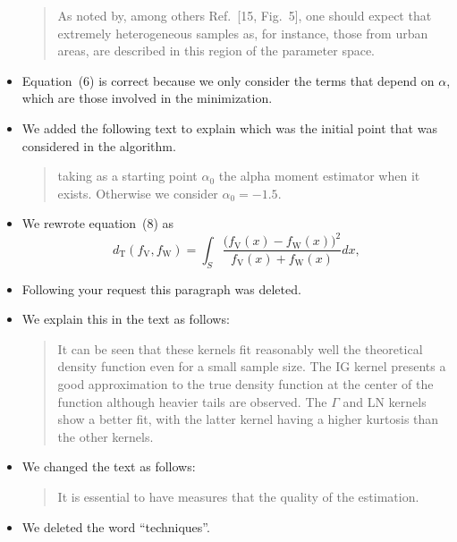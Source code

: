 \documentclass{ar2rc}
\begin{document}
\begin{itemize}
\begin{quote}
			As noted by, among others Ref.~[15, Fig.~5], one should expect that extremely heterogeneous samples as, for instance, those from urban areas, are described in this region of the parameter space.
		\end{quote}
		\item Equation~(6) is correct because we only consider the terms that depend on $\alpha$, which are those involved in the minimization.
		\item We added the following text to explain which was the initial point that was considered in the algorithm.
		\begin{quote}
			taking as a starting point $\alpha_0$ the alpha moment estimator when it exists. Otherwise we consider $\alpha_0=-1.5$.
		\end{quote}
		\item We rewrote equation~(8) as 
		\begin{equation}
			d_{\text{{T}}}(f_{\text{{V}}},f_{\text{{W}}})=\int_{S}\frac{\big(f_{\text{{V}}}(x)-f_{\text{{W}}}(x)\big)^2}{f_{\text{{V}}}(x)+f_{\text{{W}}}(x)}dx,
			\label{DT}
		\end{equation}
		
		\item Following your request this paragraph was deleted.
		\item We explain this in the text as follows:
		\begin{quote}
			It can be seen that these kernels fit reasonably well the theoretical density function even for a small sample size. The IG kernel presents a good approximation to the true density function at the center of the function although heavier tails are observed. The $\Gamma$ and LN kernels show a better fit, with the latter kernel having a higher kurtosis than the other kernels.
		\end{quote}
		\item We changed the text as follows:
		\begin{quote}		
			It is essential to have measures that \DIFdelbegin {} \DIFdelend \DIFaddbegin {}\DIFaddend the quality of the estimation. 
		\end{quote}
		\item We deleted the word ``techniques''.
	\end{itemize}
	
	
	
	
\end{document}
